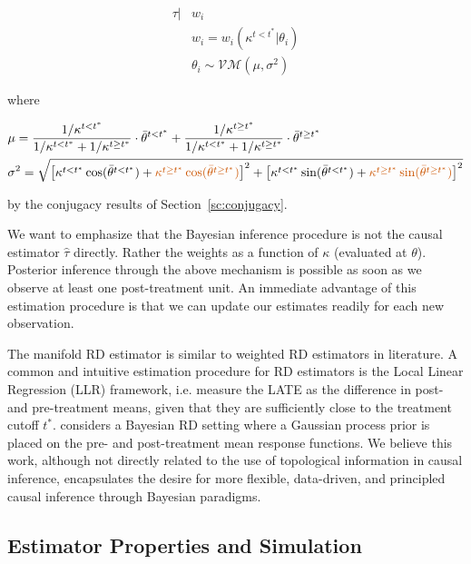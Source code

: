 \documentclass[twoside,11pt]{article}
\begin{document}
\[
  \begin{aligned}
    \tau | &w_i \\
           &w_i = w_i(\kappa^{t<t^*}|\theta_i) \\
           &\theta_i \sim \mathcal{VM}(\mu, \sigma^2)
\end{aligned}
\]

where

\[
\begin{aligned}
  &\mu =  \frac{1/\kappa^{t<t^*}}{1/\kappa^{t<t^*} + 1/\kappa^{t \geq t^*}} \cdot \bar{\theta}^{t < t^*} + \frac{1/\kappa^{t \geq t^*}}{1/\kappa^{t < t^*} + 1/\kappa^{t \geq t^*}} \cdot \bar{\theta}^{t \geq t^*} \\
  &\sigma^2 = \sqrt{\left[\kappa^{t < t^*}\cos(\bar{\theta}^{t < t^*}) + \textcolor{darkorange}{\kappa^{t \geq t^*}\cos(\bar{\theta}^{t \geq t^*})}\right]^2 
  + 
\left[\kappa^{t < t^*}\sin(\bar{\theta}^{t < t^*}) + \textcolor{darkorange}{\kappa^{t \geq t^*}\sin(\bar{\theta}^{t \geq t^*})}\right]^2} 
\end{aligned}
\]

by the conjugacy results of Section~\ref{sc:conjugacy}. 

We want to emphasize that the Bayesian inference procedure is not the causal estimator $\hat{\tau}$ directly. Rather the weights as a function of $\kappa$ (evaluated at $\theta$). Posterior inference through the above mechanism is possible as soon as we observe at least one post-treatment unit. An immediate advantage of this estimation procedure is that we can update our estimates readily for each new observation. 

The manifold RD estimator is similar to weighted RD estimators in literature. A common and intuitive estimation procedure for RD estimators is the Local Linear Regression (LLR) framework, i.e. measure the LATE as the difference in post- and pre-treatment means, given that they are sufficiently close to the treatment cutoff $t^*$. \citet{Branson2019} considers a Bayesian RD setting where a Gaussian process prior is placed on the pre- and post-treatment mean response functions. We believe this work, although not directly related to the use of topological information in causal inference, encapsulates the desire for more flexible, data-driven, and principled causal inference through Bayesian paradigms.   


\subsection{Estimator Properties and Simulation}
\end{document}
